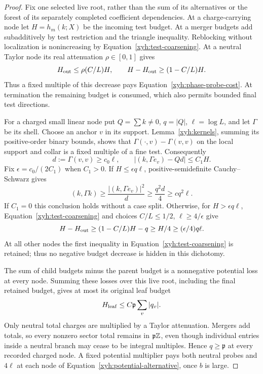 \begin{proof}
Fix one selected live root, rather than the sum of its alternatives or
the forest of its separately completed coefficient dependencies.
At a charge-carrying node let $H=h_m(k;X)$ be the incoming test budget.
At a merger budgets add subadditively by test restriction and the
triangle inequality. Reblocking without localization is nonincreasing
by Equation~\eqref{xyh:test-coarsening}. At a neutral Taylor node its
real attenuation $\rho\in[0,1]$ gives
\[
 H_{\rm out}\le\rho(C/L)H,\qquad
 H-H_{\rm out}\ge(1-C/L)H.
\]
Thus a fixed multiple of this decrease pays
Equation~\eqref{xyh:phase-probe-cost}. At termination the remaining budget
is consumed, which also permits bounded final test directions.

For a charged small linear node put $Q=\sum k\ne0$, $q=|Q|$,
$\ell=\log L$, and let $\Gamma$ be its shell. Choose an anchor $v$ in
its support. Lemma~\ref{xyh:kernels}, summing its positive-order binary
bounds, shows that $\Gamma(\cdot,v)-\Gamma(v,v)$ on the local support
and collar is a fixed multiple of a fine test. Consequently
\[
 d:=\Gamma(v,v)\ge c_0\ell,\qquad
 |(k,\Gamma e_v)-Qd|\le C_1H.
\]
Fix $\epsilon=c_0/(2C_1)$ when $C_1>0$. If $H\le\epsilon q\ell$,
positive-semidefinite Cauchy--Schwarz gives
\begin{equation}\label{xyh:energy-alternative}
 (k,\Gamma k)\ge\frac{|(k,\Gamma e_v)|^2}{d}
       \ge\frac{q^2d}{4}\ge c q^2\ell.
\end{equation}
If $C_1=0$ this conclusion holds without a case split. Otherwise, for
$H>\epsilon q\ell$, Equation~\eqref{xyh:test-coarsening} and choices
$C/L\le1/2$, $\ell\ge4/\epsilon$ give
\begin{equation}\label{xyh:potential-alternative}
 H-H_{\rm out}\ge(1-C/L)H-q\ge H/4
                         \ge(\epsilon/4)q\ell.
\end{equation}
At all other nodes the first inequality in
Equation~\eqref{xyh:test-coarsening} is retained; thus no negative
budget decrease is hidden in this dichotomy.

The sum of child budgets minus the parent budget is a nonnegative
potential loss at every node. Summing these losses over this live root,
including the final retained budget, gives at most its original leaf
budget
\begin{equation}\label{xyh:initial-budget}
 H_{\rm leaf}\le C\mathfrak p\sum_v|q_v|.
\end{equation}
Only neutral total charges are multiplied by a Taylor attenuation.
Mergers add totals, so every nonzero sector total remains in
$\mathfrak p\mathbb Z$, even though individual entries inside a neutral branch
may cease to be integral multiples. Hence $q\ge\mathfrak p$ at every
recorded charged node. A fixed potential multiplier pays both neutral
probes and $4\ell$ at each node of
Equation~\eqref{xyh:potential-alternative}, once $b$ is large.


\end{proof}
